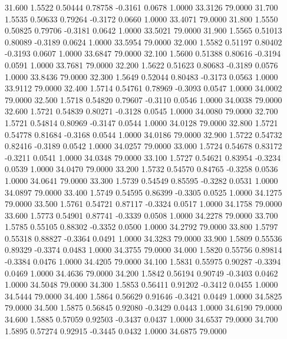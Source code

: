   31.600   1.5522   0.50444   0.78758  -0.3161   0.0678   1.0000  33.3126  79.0000
  31.700   1.5535   0.50633   0.79264  -0.3172   0.0660   1.0000  33.4071  79.0000
  31.800   1.5550   0.50825   0.79706  -0.3181   0.0642   1.0000  33.5021  79.0000
  31.900   1.5565   0.51013   0.80089  -0.3189   0.0624   1.0000  33.5954  79.0000
  32.000   1.5582   0.51197   0.80402  -0.3193   0.0607   1.0000  33.6847  79.0000
  32.100   1.5600   0.51388   0.80616  -0.3194   0.0591   1.0000  33.7681  79.0000
  32.200   1.5622   0.51623   0.80683  -0.3189   0.0576   1.0000  33.8436  79.0000
  32.300   1.5649   0.52044   0.80483  -0.3173   0.0563   1.0000  33.9112  79.0000
  32.400   1.5714   0.54761   0.78969  -0.3093   0.0547   1.0000  34.0002  79.0000
  32.500   1.5718   0.54820   0.79607  -0.3110   0.0546   1.0000  34.0038  79.0000
  32.600   1.5721   0.54839   0.80271  -0.3128   0.0545   1.0000  34.0080  79.0000
  32.700   1.5721   0.54814   0.80969  -0.3147   0.0544   1.0000  34.0128  79.0000
  32.800   1.5721   0.54778   0.81684  -0.3168   0.0544   1.0000  34.0186  79.0000
  32.900   1.5722   0.54732   0.82416  -0.3189   0.0542   1.0000  34.0257  79.0000
  33.000   1.5724   0.54678   0.83172  -0.3211   0.0541   1.0000  34.0348  79.0000
  33.100   1.5727   0.54621   0.83954  -0.3234   0.0539   1.0000  34.0470  79.0000
  33.200   1.5732   0.54570   0.84765  -0.3258   0.0536   1.0000  34.0641  79.0000
  33.300   1.5739   0.54549   0.85595  -0.3282   0.0531   1.0000  34.0897  79.0000
  33.400   1.5749   0.54595   0.86399  -0.3305   0.0525   1.0000  34.1275  79.0000
  33.500   1.5761   0.54721   0.87117  -0.3324   0.0517   1.0000  34.1758  79.0000
  33.600   1.5773   0.54901   0.87741  -0.3339   0.0508   1.0000  34.2278  79.0000
  33.700   1.5785   0.55105   0.88302  -0.3352   0.0500   1.0000  34.2792  79.0000
  33.800   1.5797   0.55318   0.88827  -0.3364   0.0491   1.0000  34.3283  79.0000
  33.900   1.5809   0.55536   0.89329  -0.3374   0.0483   1.0000  34.3755  79.0000
  34.000   1.5820   0.55756   0.89814  -0.3384   0.0476   1.0000  34.4205  79.0000
  34.100   1.5831   0.55975   0.90287  -0.3394   0.0469   1.0000  34.4636  79.0000
  34.200   1.5842   0.56194   0.90749  -0.3403   0.0462   1.0000  34.5048  79.0000
  34.300   1.5853   0.56411   0.91202  -0.3412   0.0455   1.0000  34.5444  79.0000
  34.400   1.5864   0.56629   0.91646  -0.3421   0.0449   1.0000  34.5825  79.0000
  34.500   1.5875   0.56845   0.92080  -0.3429   0.0443   1.0000  34.6190  79.0000
  34.600   1.5885   0.57059   0.92503  -0.3437   0.0437   1.0000  34.6537  79.0000
  34.700   1.5895   0.57274   0.92915  -0.3445   0.0432   1.0000  34.6875  79.0000
